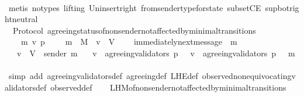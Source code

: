\begin{isabellebody}
\ \ \ \ \ \ \isamarkupfalse%
\ {\isacharparenleft}metis\ {\isacharparenleft}no{\isacharunderscore}types{\isacharcomma}\ lifting{\isacharparenright}\ Un{\isacharunderscore}insert{\isacharunderscore}right\ from{\isacharunderscore}sender{\isacharunderscore}type{\isacharunderscore}for{\isacharunderscore}state\ subsetCE\ sup{\isacharunderscore}bot{\isachardot}right{\isacharunderscore}neutral{\isacharparenright}\ \ \ \ \ \ \ \isanewline
\ \ \isamarkupfalse%
\isanewline
{}\isamarkupfalse%
%
\endisatagproof
{\isafoldproof}%
%
\isadelimproof
\ \ \ \ \isanewline
%
\endisadelimproof
\isanewline
\isanewline
{}\isamarkupfalse%
\ {\isacharparenleft}\ Protocol{\isacharparenright}\ agreeing{\isacharunderscore}status{\isacharunderscore}of{\isacharunderscore}non{\isacharunderscore}sender{\isacharunderscore}not{\isacharunderscore}affected{\isacharunderscore}by{\isacharunderscore}minimal{\isacharunderscore}transitions\ {\isacharcolon}\isanewline
\ \ {\isachardoublequoteopen}{\isasymforall}\ {\isasymsigma}\ m\ v\ p{\isachardot}\ {\isasymsigma}\ {\isasymin}\ {\isasymSigma}\ {\isasymand}\ m\ {\isasymin}\ M\ {\isasymand}\ v\ {\isasymin}\ V\ \isanewline
\ \ {\isasymlongrightarrow}\ immediately{\isacharunderscore}next{\isacharunderscore}message\ {\isacharparenleft}{\isasymsigma}{\isacharcomma}\ m{\isacharparenright}\isanewline
\ \ {\isasymlongrightarrow}\ v\ {\isasymin}\ V\ {\isacharminus}\ {\isacharbraceleft}sender\ m{\isacharbraceright}\isanewline
\ \ {\isasymlongrightarrow}\ v\ {\isasymin}\ agreeing{\isacharunderscore}validators\ {\isacharparenleft}p{\isacharcomma}\ {\isasymsigma}{\isacharparenright}\ {\isasymlongleftrightarrow}\ v\ {\isasymin}\ agreeing{\isacharunderscore}validators\ {\isacharparenleft}p{\isacharcomma}\ {\isasymsigma}\ {\isasymunion}\ {\isacharbraceleft}m{\isacharbraceright}{\isacharparenright}{\isachardoublequoteclose}\isanewline
%
\isadelimproof
\ \ %
\endisadelimproof
%
\isatagproof
{}\isamarkupfalse%
\ {\isacharparenleft}simp\ add{\isacharcolon}\ agreeing{\isacharunderscore}validators{\isacharunderscore}def\ agreeing{\isacharunderscore}def\ L{\isacharunderscore}H{\isacharunderscore}E{\isacharunderscore}def\ observed{\isacharunderscore}non{\isacharunderscore}equivocating{\isacharunderscore}validators{\isacharunderscore}def\ observed{\isacharunderscore}def{\isacharparenright}\isanewline
\ \ \isamarkupfalse%
\ L{\isacharunderscore}H{\isacharunderscore}M{\isacharunderscore}of{\isacharunderscore}non{\isacharunderscore}sender{\isacharunderscore}not{\isacharunderscore}affected{\isacharunderscore}by{\isacharunderscore}minimal{\isacharunderscore}transitions\ \isanewline

\end{isabellebody}
